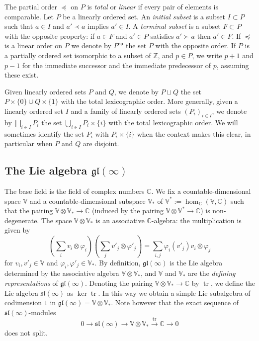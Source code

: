 \documentclass[11pt,fleqn]{amsart}
\newcommand\CC{\mathbb C}
\newcommand\ZZ{\mathbb Z}
\renewcommand\to{\longrightarrow}
\renewcommand\phi{\varphi}
\theoremstyle{definition}
\theoremstyle{remark}
\theoremstyle{remark}
\newcommand\VV{\mathbb V}
\newcommand\gl{\mathfrak{gl}}
\renewcommand\sl{\mathfrak{sl}}
\newcommand\op{\mathsf{op}}
\begin{document}
The partial order $\preceq$ on $P$ is \emph{total} or \emph{linear} if 
every pair of elements is comparable. Let $P$ be a linearly ordered set. An 
\emph{initial subset} is a subset $I \subset P$ such that $a \in I$ and $a' 
\prec a$ implies $a' \in I$. A \emph{terminal subset} is a subset $F \subset P$ 
with the opposite property: if $a \in F$ and $a' \in P$ satisfies $a' \succ a$ 
then $a' \in F$. If $\preceq$ is a linear order on $P$ we denote by $P^\op$ the 
set $P$ with the opposite order. If $P$ is a partially ordered set isomorphic
to a subset of $\ZZ$, and $p \in P$, we write $p+1$ and $p-1$ for the immediate 
successor and the immediate predecessor of $p$, assuming these exist.

Given linearly ordered sets $P$ and $Q$, we denote by $P 
\sqcup Q$ the set $P \times \{0\} \cup Q \times \{1\}$ with the total 
lexicographic order. More generally, given a linearly ordered set $I$ and a 
family of linearly ordered sets $(P_i)_{i \in I}$, we denote by $\bigsqcup_{i 
\in I} P_i$ the set $\bigcup_{i \in I} P_i \times \{i\}$ with the total 
lexicographic order. We will sometimes identify the set $P_i$ with $P_i \times 
\{i\}$ when the context makes this clear, in particular when $P$ and $Q$ are 
disjoint.

\subsection{The Lie algebra $\gl(\infty)$}
The base field is the field of complex numbers $\CC$. We fix a 
countable-dimensional space $\VV$ and a countable-dimensional subspace $\VV_*$ 
of $\VV^* := \hom_\CC(\VV,\CC)$ such that the pairing $\VV \otimes \VV_* \to 
\CC$ (induced by the pairing $\VV \otimes \VV^* \to \CC$) is non-degenerate. 
The space $\VV \otimes \VV_*$ is an associative $\CC$-algebra: the 
multiplication is given by
\[
  \left(\sum_i v_i \otimes \phi_i\right)
    \left(\sum_j v'_j \otimes \phi'_j\right)
    = \sum_{i,j} \phi_i(v'_j)v_i \otimes \phi_j
\]
for $v_i, v'_j \in \VV$ and $\phi_i, \phi'_j \in \VV_*$. By definition, 
$\gl(\infty)$ is the Lie algebra determined by the associative algebra $\VV 
\otimes \VV_*$, and $\VV$ and $\VV_*$ are the \emph{defining representations} 
of $\gl(\infty)$. Denoting the pairing $\VV \otimes 
\VV_* \to \CC$ by $\operatorname{tr}$, we define the Lie algebra $\sl(\infty)$ as 
$\ker \operatorname{tr}$. In this way we obtain a simple Lie subalgebra of 
codimension $1$ in $\gl(\infty) = \VV \otimes \VV_*$. Note however that the exact sequence of $\sl(\infty)$-modules
\[
  0 \to \sl(\infty) \to \VV \otimes \VV_* \stackrel{\operatorname{tr}}{\to} \CC \to 0
\]
does not split.
\end{document}
